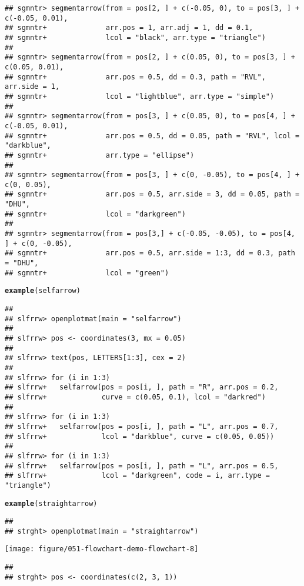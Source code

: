 \documentclass{article}\usepackage[]{graphicx}\usepackage[]{xcolor}
\makeatletter
\def\maxwidth{ %
  \ifdim\Gin@nat@width>\linewidth
    \linewidth
  \else
    \Gin@nat@width
  \fi
}
\newcommand{\hldef}[1]{\textcolor[rgb]{0.345,0.345,0.345}{#1}}%
\newcommand{\hlkwd}[1]{\textcolor[rgb]{0.737,0.353,0.396}{\textbf{#1}}}%
\newenvironment{kframe}{%
 \def\at@end@of@kframe{}%
 \ifinner\ifhmode%
  \def\at@end@of@kframe{\end{minipage}}%
  \begin{minipage}{\columnwidth}%
 \fi\fi%
 \def\FrameCommand##1{\hskip\@totalleftmargin \hskip-\fboxsep
 \colorbox{shadecolor}{##1}\hskip-\fboxsep
     \hskip-\linewidth \hskip-\@totalleftmargin \hskip\columnwidth}%
 \MakeFramed {\advance\hsize-\width
   \@totalleftmargin\z@ \linewidth\hsize
   \@setminipage}}%
 {\par\unskip\endMakeFramed%
 \at@end@of@kframe}
\newenvironment{knitrout}{}{} %
\makeatother
\begin{document}
\begin{knitrout}
\begin{kframe}
\begin{verbatim}
## sgmntr> segmentarrow(from = pos[2, ] + c(-0.05, 0), to = pos[3, ] + c(-0.05, 0.01),
## sgmntr+              arr.pos = 1, arr.adj = 1, dd = 0.1,
## sgmntr+              lcol = "black", arr.type = "triangle")
## 
## sgmntr> segmentarrow(from = pos[2, ] + c(0.05, 0), to = pos[3, ] + c(0.05, 0.01),
## sgmntr+              arr.pos = 0.5, dd = 0.3, path = "RVL", arr.side = 1,
## sgmntr+              lcol = "lightblue", arr.type = "simple")  
## 
## sgmntr> segmentarrow(from = pos[3, ] + c(0.05, 0), to = pos[4, ] + c(-0.05, 0.01),
## sgmntr+              arr.pos = 0.5, dd = 0.05, path = "RVL", lcol = "darkblue",
## sgmntr+              arr.type = "ellipse")  
## 
## sgmntr> segmentarrow(from = pos[3, ] + c(0, -0.05), to = pos[4, ] + c(0, 0.05),
## sgmntr+              arr.pos = 0.5, arr.side = 3, dd = 0.05, path = "DHU",
## sgmntr+              lcol = "darkgreen")  
## 
## sgmntr> segmentarrow(from = pos[3,] + c(-0.05, -0.05), to = pos[4, ] + c(0, -0.05),
## sgmntr+              arr.pos = 0.5, arr.side = 1:3, dd = 0.3, path = "DHU",
## sgmntr+              lcol = "green")
\end{verbatim}
\begin{alltt}
\hlkwd{example}\hldef{(selfarrow)}
\end{alltt}
\begin{verbatim}
## 
## slfrrw> openplotmat(main = "selfarrow")
## 
## slfrrw> pos <- coordinates(3, mx = 0.05)
## 
## slfrrw> text(pos, LETTERS[1:3], cex = 2)
## 
## slfrrw> for (i in 1:3) 
## slfrrw+   selfarrow(pos = pos[i, ], path = "R", arr.pos = 0.2,
## slfrrw+             curve = c(0.05, 0.1), lcol = "darkred")
## 
## slfrrw> for (i in 1:3) 
## slfrrw+   selfarrow(pos = pos[i, ], path = "L", arr.pos = 0.7,
## slfrrw+             lcol = "darkblue", curve = c(0.05, 0.05))
## 
## slfrrw> for (i in 1:3) 
## slfrrw+   selfarrow(pos = pos[i, ], path = "L", arr.pos = 0.5,
## slfrrw+             lcol = "darkgreen", code = i, arr.type = "triangle")
\end{verbatim}
\begin{alltt}
\hlkwd{example}\hldef{(straightarrow)}
\end{alltt}
\begin{verbatim}
## 
## strght> openplotmat(main = "straightarrow")
\end{verbatim}
\end{kframe}
\texttt{[image: figure/051-flowchart-demo-flowchart-8]} 
\begin{kframe}\begin{verbatim}
## 
## strght> pos <- coordinates(c(2, 3, 1))

\end{verbatim}
\end{kframe}
\end{knitrout}
\end{document}
